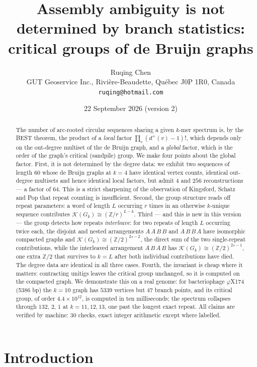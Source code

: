 \documentclass[11pt]{article}
\title{\bfseries Assembly ambiguity is not determined by branch statistics:\\
critical groups of de Bruijn graphs}
\author{Ruqing Chen\\[2pt]
\normalsize GUT Geoservice Inc., Rivi\`ere-Beaudette, Qu\'ebec J0P 1R0, Canada\\
\normalsize\texttt{ruqing@hotmail.com}}
\date{22 September 2026 (version 2)}
\theoremstyle{plain}
\theoremstyle{definition}
\theoremstyle{remark}
\newcommand{\Z}{\mathbb{Z}}
\newcommand{\K}{\mathcal{K}}
\begin{document}
\maketitle

\begin{abstract}
\noindent
The number of arc-rooted circular sequences sharing a given $k$-mer spectrum is, by the
BEST theorem, the product of a \emph{local} factor $\prod_v(d^+(v)-1)!$, which depends only
on the out-degree multiset of the de Bruijn graph, and a \emph{global} factor, which is the
order of the graph's critical (sandpile) group. We make four points about the global factor.
First, it is not determined by the degree data: we exhibit two sequences of length $60$
whose de Bruijn graphs at $k=4$ have identical vertex counts, identical out-degree
multisets and hence identical local factors, but admit $4$ and $256$ reconstructions --- a
factor of $64$. This is a strict sharpening of the observation of Kingsford, Schatz and Pop
that repeat counting is insufficient. Second, the group structure reads off repeat
parameters: a word of length $L$ occurring $r$ times in an otherwise $k$-unique sequence
contributes $\K(G_k)\cong(\Z/r)^{L-k}$. Third --- and this is new in this version --- the
group detects how repeats \emph{interleave}: for two repeats of length $L$ occurring twice
each, the disjoint and nested arrangements $A\,A\,B\,B$ and $A\,B\,B\,A$ have isomorphic
compacted graphs and $\K(G_k)\cong(\Z/2)^{2s-2}$, the direct sum of the two single-repeat
contributions, while the interleaved arrangement $A\,B\,A\,B$ has $\K(G_k)\cong(\Z/2)^{2s-1}$,
one extra $\Z/2$ that survives to $k=L$ after both individual contributions have died. The
degree data are identical in all three cases. Fourth, the invariant is cheap where it
matters: contracting unitigs leaves the critical group unchanged, so it is computed on the
compacted graph. We demonstrate this on a real genome: for bacteriophage $\varphi$X174
(5386 bp) the $k=10$ graph has $5339$ vertices but $47$ branch points, and its critical
group, of order $4.4\times10^{12}$, is computed in ten milliseconds; the spectrum collapses
through $132$, $2$, $1$ at $k=11,12,13$, one past the longest exact repeat. All claims are
verified by machine: $30$ checks, exact integer arithmetic except where labelled.
\end{abstract}

\section{Introduction}\label{sec:intro}
\end{document}

